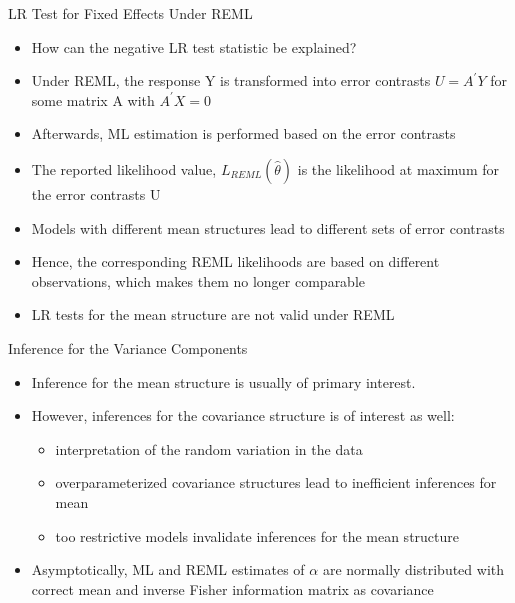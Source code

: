 \documentclass{beamer}
\begin{document}
\begin{frame}{LR Test for Fixed Effects Under REML}
\begin{itemize}
	\item How can the negative LR test statistic be explained?
	\item Under REML, the response Y is transformed into error contrasts $U =A^{'}Y$ for some matrix A with $A^{'}X = 0$
	\item Afterwards, ML estimation is performed based on the error contrasts
	\item The reported likelihood value, $L_{REML}(\hat{\theta})$ is the likelihood at maximum for the error contrasts U
	\item Models with different mean structures lead to different sets of error contrasts
	\item Hence, the corresponding REML likelihoods are based on different observations, which makes them no longer comparable
	\item LR tests for the mean structure are not valid under REML
\end{itemize}
\end{frame}

\begin{frame}{Inference for the Variance Components}
\begin{itemize}
	\item Inference for the mean structure is usually of primary interest.
	\item However, inferences for the covariance structure is of interest as well:
	\begin{itemize}
		\item interpretation of the random variation in the data
		\item overparameterized covariance structures lead to inefficient inferences for mean
		\item too restrictive models invalidate inferences for the mean structure
	\end{itemize}
\item Asymptotically, ML and REML estimates of $\alpha$ are normally distributed with correct mean and inverse Fisher information matrix as covariance
\end{itemize}
\end{frame}
\end{document}
